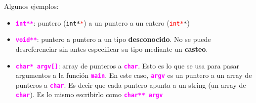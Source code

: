 \documentclass[]{scrartcl}
\newcommand{\hl}[1]{\textcolor{magenta}{\textbf{\texttt{#1}}}}
\begin{document}
\begin{center}
  \noindent {}
  \label{fig:pointing-int-meme}
\end{center}


Algunos ejemplos:
\begin{itemize}
  \item \hl{int**}: puntero (\texttt{int*\textcolor{red}{*}}) a un puntero a un entero (\texttt{\textcolor{red}{int*}*})
  \item \hl{void**}: puntero a puntero a un tipo \textbf{desconocido}. No se puede desreferenciar sin antes especificar su tipo mediante un \textbf{casteo}.
  \item \hl{char* argv[]}: array de punteros a \hl{char}. Esto es lo que se usa para pasar argumentos a la función \hl{main}. En este caso, \hl{argv} es un puntero a un array de punteros a \hl{char}. Es decir que cada puntero apunta a un string (un array de \hl{char}). Es lo mismo escribirlo como \hl{char** argv} 
        
\end{itemize}

\begin{center}
  \noindent {}
  \label{fig:doble-puntero}
\end{center}
\end{document}
